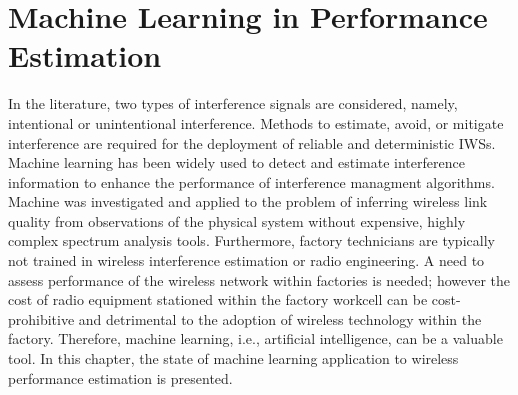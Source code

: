 

\section{Machine Learning in Performance Estimation}\label{chapter:soa:ml}

In the literature, two types of interference signals are considered, namely, intentional or unintentional interference. Methods to estimate, avoid, or mitigate interference are required for the deployment of reliable and deterministic IWSs. Machine learning has been widely used to detect and estimate interference information to enhance the performance of interference managment algorithms.  Machine was investigated and applied to the problem of inferring wireless link quality from observations of the physical system without expensive, highly complex spectrum analysis tools.  Furthermore, factory technicians are typically not trained in wireless interference estimation or radio engineering.  A need to assess performance of the wireless network within factories is needed; however the cost of radio equipment stationed within the factory workcell can be cost-prohibitive and detrimental to the adoption of wireless technology within the factory.  Therefore, machine learning, i.e., artificial intelligence, can be a valuable tool.  In this chapter, the state of machine learning application to wireless performance estimation is presented.

